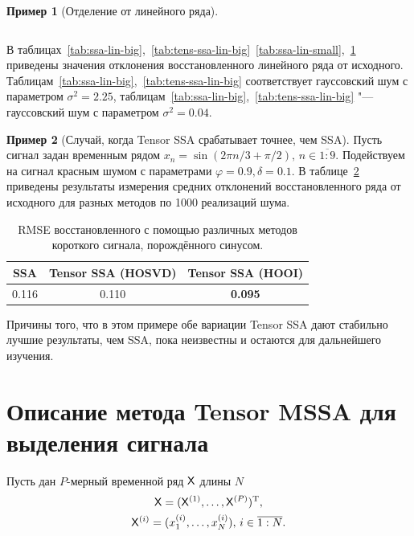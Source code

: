 \documentclass[specialist,
    substylefile = spbu_report.rtx,
    subf,href,colorlinks=true, 12pt]{disser}
\theoremstyle{plain}
\theoremstyle{definition}
\newtheorem{example}{Пример}[section]
\theoremstyle{remark}
\begin{document}
\begin{example}[Отделение от линейного ряда]
\begin{table}[!ht]
\begin{tabular}{r|r|rrrrr}
                \hline
            \end{tabular}\label{tab:tens-ssa-lin-small}
        \end{table}
        В таблицах~\ref{tab:ssa-lin-big},~\ref{tab:tens-ssa-lin-big}~\ref{tab:ssa-lin-small},~\ref{tab:tens-ssa-lin-small}
        приведены значения отклонения восстановленного линейного ряда от исходного.
        Таблицам~\ref{tab:ssa-lin-big},~\ref{tab:tens-ssa-lin-big} соответствует гауссовский шум с параметром $\sigma^2=2.25$,
        таблицам~\ref{tab:ssa-lin-big},~\ref{tab:tens-ssa-lin-big} "--- гауссовский шум с параметром $\sigma^2=0.04$.
    \end{example}

    \begin{example}[Случай, когда Tensor SSA срабатывает точнее, чем SSA]
        Пусть сигнал задан временным рядом $x_n = \sin(2\pi n/3 + \pi /2),\, n\in \overline{1:9}$.
        Подействуем на сигнал красным шумом с параметрами $\varphi=0.9, \delta = 0.1$.
        В таблице~\ref{tab:tssa-better-ssa} приведены результаты измерения средних отклонений восстановленного ряда от исходного
        для разных методов по 1000 реализаций шума.

        \begin{table}[!ht]
            \centering
            \caption{RMSE восстановленного с помощью различных методов короткого сигнала, порождённого синусом.}
            \begin{tabular}{ccc}
                \hline
                SSA   & Tensor SSA (HOSVD) & Tensor SSA (HOOI) \\
                \hline
                0.116 & 0.110              & \textbf{0.095}    \\
                \hline
            \end{tabular}\label{tab:tssa-better-ssa}
        \end{table}

        Причины того, что в этом примере обе вариации Tensor SSA дают стабильно лучшие результаты, чем SSA, пока неизвестны
        и остаются для дальнейшего изучения.
    \end{example}


    \section{Описание метода Tensor MSSA для выделения сигнала}\label{sec:Tensor-MSSA-method-description}
    Пусть дан $P$-мерный временной ряд $\mathsf{X}$ длины $N$
    \begin{gather*}
        \mathsf{X} = (\mathsf{X}^{(1)}, \ldots, \mathsf{X}^{(P)})^{\mathrm{T}},\\
        \mathsf{X}^{(i)} = (x_1^{(i)}, \ldots, x_N^{(i)}),\, i \in \overline{1:N}.
    \end{gather*}
\end{document}
